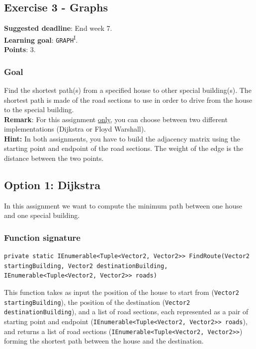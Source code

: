 \newpage
\subsection*{Exercise 3 - Graphs}
\textbf{Suggested deadline}: End week 7. \\
\textbf{Learning goal}: \texttt{GRAPH}\textsuperscript{I}. \\
\textbf{Points}: 3.

\subsubsection*{Goal}
Find the shortest path(s) from a specified house to other special building(s). The shortest path is made of the road sections to use in order to drive from the house to the special building.\\
\textbf{Remark}: For this assignment \underline{only}, you can choose between two different implementations (Dijkstra or Floyd Warshall).\\
\textbf{Hint:} In both assignments, you have to build the adjacency matrix using the starting point and endpoint of the road sections. The weight of the edge is the distance between the two points.

\subsection*{Option 1: Dijkstra}
In this assignment we want to compute the minimum path between one house and one special building. 

\subsubsection*{Function signature} 
\begin{lstlisting}
private static IEnumerable<Tuple<Vector2, Vector2>> FindRoute(Vector2 startingBuilding, Vector2 destinationBuilding, IEnumerable<Tuple<Vector2, Vector2>> roads)
\end{lstlisting}

\noindent
This function takes as input the position of the house to start from (\texttt{Vector2 startingBuilding}), the position of the destination (\texttt{Vector2 destinationBuilding}), and a list of road sections, each represented as a pair of starting point and endpoint (\texttt{IEnumerable<Tuple<Vector2, Vector2>> roads}), and returns a list of road sections (\texttt{IEnumerable<Tuple<Vector2, Vector2>>}) forming the shortest path between the house and the destination.\\

